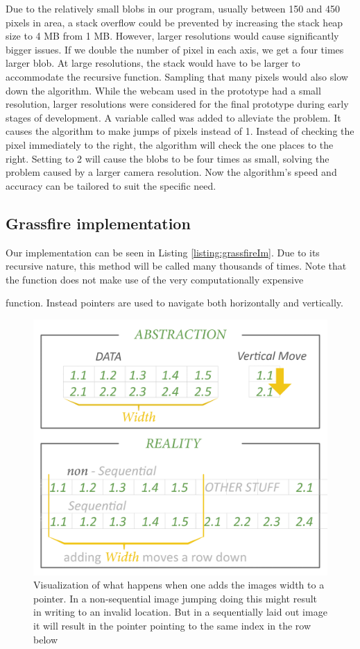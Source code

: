 {Due to the relatively small blobs in our program, usually between 150 and 450 pixels in area, a stack overflow could be prevented by increasing the stack heap size to 4 MB from 1 MB. However, larger resolutions would cause significantly bigger issues. If we double the number of pixel in each axis, we get a four times larger blob. At large resolutions, the stack would have to be larger to accommodate the recursive function. Sampling that many pixels would also slow down the algorithm. While the webcam used in the prototype had a small resolution, larger resolutions were considered for the final prototype during early stages of development. A variable called  was added to alleviate the problem. It causes the algorithm to make jumps of  pixels instead of 1. Instead of checking the pixel immediately to the right, the algorithm will check the one  places to the right. Setting  to 2 will cause the blobs to be four times as small, solving the problem caused by a larger camera resolution. Now the algorithm's speed and accuracy can be tailored to suit the specific need.
\subsection{Grassfire implementation}
Our implementation can be seen in Listing \ref{listing:grassfireIm}. Due to its recursive nature, this method will be called many thousands of times. Note that the function does not make use of the very computationally expensive } function. Instead pointers are used to navigate both horizontally and vertically.
\begin{figure}[H]
	\centering
	\includegraphics[width=0.6\linewidth]{figure/Analysis/data.png}
	\caption{Visualization of what happens when one adds the images width to a pointer. In a non-sequential image jumping doing this might result in writing to an invalid location. But in a sequentially laid out image it will result in the pointer pointing to the same index in the row below } 
	\label{fig:vis}
\end{figure}
